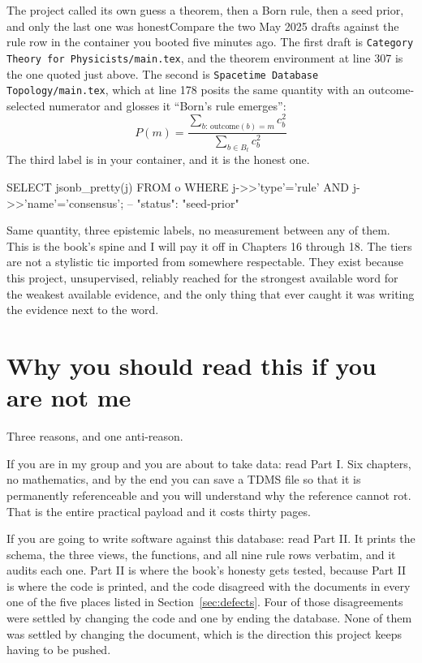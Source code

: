 \begin{Correspondence}{The project called its own guess a theorem, then a Born rule, then a seed prior, and only the last one was honest}{Compare the two May 2025 drafts against the  rule row in the container you booted five minutes ago.}
The first draft is \texttt{Category Theory for Physicists/main.tex}, and the theorem environment at line 307 is the one quoted just above. The second is \texttt{Spacetime Database Topology/main.tex}, which at line 178 posits the same quantity with an outcome-selected numerator and glosses it ``Born's rule emerges'':
\begin{equation*}
P(m) = \frac{\sum_{b:\,\mathrm{outcome}(b)=m} c_b^2}{\sum_{b \in B_t} c_b^2}
\end{equation*}
The third label is in your container, and it is the honest one.
\begin{Check}
SELECT jsonb_pretty(j) FROM o
 WHERE j->>'type'='rule' AND j->>'name'='consensus';   -- "status": "seed-prior"
\end{Check}
Same quantity, three epistemic labels, no measurement between any of them. This is the book's spine and I will pay it off in Chapters 16 through 18. The tiers are not a stylistic tic imported from somewhere respectable. They exist because this project, unsupervised, reliably reached for the strongest available word for the weakest available evidence, and the only thing that ever caught it was writing the evidence next to the word.
\end{Correspondence}

\section{Why you should read this if you are not me}

Three reasons, and one anti-reason.

If you are in my group and you are about to take data: read Part I. Six chapters, no mathematics, and by the end you can save a TDMS file so that it is permanently referenceable and you will understand why the reference cannot rot. That is the entire practical payload and it costs thirty pages.

If you are going to write software against this database: read Part II. It prints the schema, the three views, the functions, and all nine rule rows verbatim, and it audits each one. Part II is where the book's honesty gets tested, because Part II is where the code is printed, and the code disagreed with the documents in every one of the five places listed in Section~\ref{sec:defects}. Four of those disagreements were settled by changing the code and one by ending the database. None of them was settled by changing the document, which is the direction this project keeps having to be pushed.

